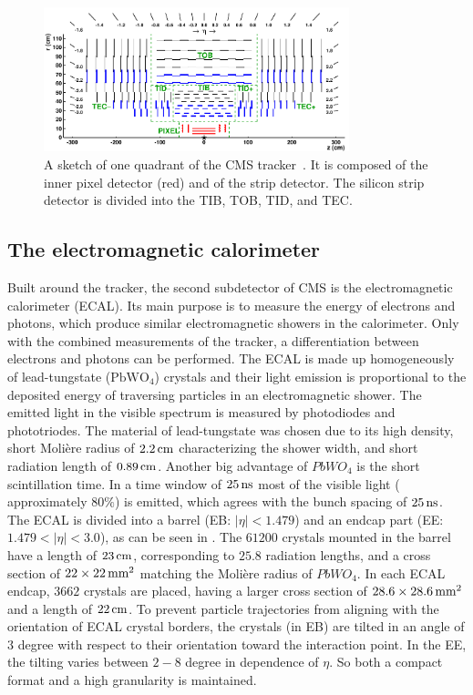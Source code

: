 \begin{figure}[bp]
 \centering
 \includegraphics[width=0.79\textwidth]{figures/general/tracker.pdf}
 \caption{A sketch of one quadrant of the CMS tracker~\cite{TrackerPDFPic}. It is composed of the inner pixel detector (red) and of the strip detector. The silicon strip detector is divided into the TIB, TOB, TID, and TEC.}
 \label{fig:tracker}
\end{figure}

\subsection{The electromagnetic calorimeter}
Built around the tracker, the second subdetector of CMS is the electromagnetic calorimeter (ECAL). Its main purpose is to measure the energy of electrons and photons, which produce similar electromagnetic showers in the calorimeter. Only with the combined measurements of the tracker, a differentiation between electrons and photons can be performed. The ECAL is made up homogeneously of lead-tungstate ($\mathrm{PbWO_4}$) crystals and their light emission is proportional to the deposited energy of traversing particles in an electromagnetic shower. The emitted light in the visible spectrum is measured by photodiodes and phototriodes. The material of lead-tungstate was chosen due to its high density, short Moli\`{e}re radius of $2.2\,\text{cm}$ characterizing the shower width, and short radiation length of $0.89\,\text{cm}$. Another big advantage of $PbWO_4$ is the short scintillation time. In a time window of $25\,\text{ns}$ most of the visible light ( approximately $80\%$) is emitted, which agrees with the bunch spacing of $25\,\text{ns}$. The ECAL is divided into a barrel (EB: $|\eta|<1.479$) and an endcap part (EE: $1.479<|\eta|<3.0$), as can be seen in . The $61200$ crystals mounted in the barrel have a length of $23\,\text{cm}$, corresponding to $25.8$ radiation lengths, and a cross section of $22\times22\,\text{mm}^2$ matching the Moli\`{e}re radius of $PbWO_4$. In each ECAL endcap, $3662$ crystals are placed, having a larger cross section of $ 28.6\times28.6\,\text{mm}^2$ and a length of $22\,\text{cm}$.
To prevent particle trajectories from aligning with the orientation of ECAL crystal borders, the crystals (in EB) are tilted in an angle of $3$ degree with respect to their orientation toward the interaction point. In the EE, the tilting varies between $2-8$ degree in dependence of $\eta$. So both a compact format and a high granularity is maintained.


